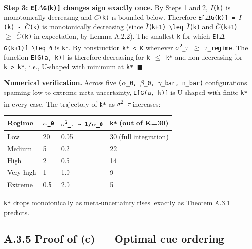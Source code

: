 \documentclass{article}
\begin{document}
\textbf{Step 3: \texttt{E{[}\ensuremath{\Delta}G(k){]}} changes sign exactly once.} By
Steps 1 and 2, \texttt{\ensuremath{\bar{I}}(k)} is monotonically decreasing and
\texttt{\ensuremath{\bar{C}}(k)} is bounded below. Therefore
\texttt{E{[}\ensuremath{\Delta}G(k){]}\ =\ \ensuremath{\bar{I}}(k)\ -\ \ensuremath{\bar{C}}(k)} is monotonically decreasing
(since \texttt{\ensuremath{\bar{I}}(k+1)\ \textbackslash{}leq\ \ensuremath{\bar{I}}(k)} and
\texttt{\ensuremath{\bar{C}}(k+1)\ \ensuremath{\geq}\ \ensuremath{\bar{C}}(k)} in expectation, by Lemma A.2.2). The smallest
\texttt{k} for which \texttt{E{[}\ensuremath{\Delta}G(k+1){]}\ \textbackslash{}leq\ 0} is
\texttt{k*}. By construction \texttt{k*\ \textless{}\ K} whenever
\texttt{\ensuremath{\sigma}\textsuperscript{2}\_\ensuremath{\tau}\ \ensuremath{\geq}\ \ensuremath{\tau}\_regime}. The function \texttt{E{[}G(a,\ k){]}} is
therefore decreasing for \texttt{k\ \ensuremath{\leq}\ k*} and non-decreasing for
\texttt{k\ \textgreater{}\ k*}, i.e., U-shaped with minimum at
\texttt{k*}. \ensuremath{\blacksquare}

\textbf{Numerical verification.} Across five
\texttt{(\ensuremath{\alpha}\_0\textquotesingle{},\ \ensuremath{\beta}\_0\textquotesingle{},\ \ensuremath{\gamma}\_bar,\ m\_bar)}
configurations spanning low-to-extreme meta-uncertainty,
\texttt{E{[}G(a,\ k){]}} is U-shaped with finite \texttt{k*} in every
case. The trajectory of \texttt{k*} as \texttt{\ensuremath{\sigma}\textsuperscript{2}\_\ensuremath{\tau}} increases:

\begin{longtable}[]{@{}llll@{}}
\toprule\noalign{}
Regime & \texttt{\ensuremath{\alpha}\_0\textquotesingle{}} &
\texttt{\ensuremath{\sigma}\textsuperscript{2}\_\ensuremath{\tau}\ \textasciitilde{}\ 1/\ensuremath{\alpha}\_0\textquotesingle{}} &
\texttt{k*} (out of K=30) \\
\midrule\noalign{}
\endhead
\bottomrule\noalign{}
\endlastfoot
Low & 20 & 0.05 & 30 (full integration) \\
Medium & 5 & 0.2 & 22 \\
High & 2 & 0.5 & 14 \\
Very high & 1 & 1.0 & 9 \\
Extreme & 0.5 & 2.0 & 5 \\
\end{longtable}

\texttt{k*} drops monotonically as meta-uncertainty rises, exactly as
Theorem A.3.1 predicts.

\subsection{A.3.5 Proof of (c) --- Optimal cue
ordering}\label{a.3.5-proof-of-c-optimal-cue-ordering}
\end{document}
